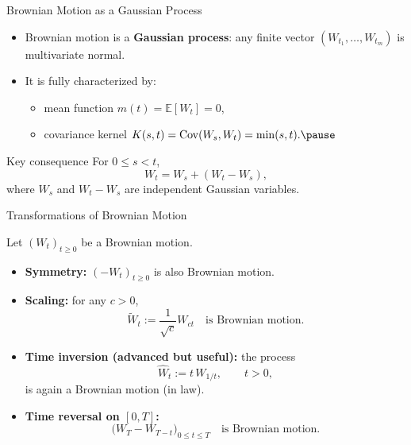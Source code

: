 \documentclass[10pt,aspectratio=169]{beamer}
\begin{document}
\begin{frame}{Brownian Motion as a Gaussian Process}

\begin{itemize}
  \item Brownian motion is a \textbf{Gaussian process}:\pause
  any finite vector \((W_{t_1},\dots,W_{t_m})\) is multivariate normal.\pause
  \item It is fully characterized by:\pause
  \begin{itemize}
    \item mean function \(m(t)=\mathbb{E}[W_t]=0\),\pause
    \item covariance kernel \(K(s,t)=\mathrm{Cov}(W_s,W_t)=\min(s,t).\pause\)
  \end{itemize}
\end{itemize}

\medskip
\begin{block}{Key consequence}
For \(0\le s<t\),
\[
W_t = W_s + (W_t-W_s),
\]
where \(W_s\) and \(W_t-W_s\) are independent Gaussian variables.
\end{block}

\end{frame}

\begin{frame}{Transformations of Brownian Motion}

Let \((W_t)_{t\ge0}\) be a Brownian motion.\pause

\begin{itemize}
  \item \textbf{Symmetry:}\pause\;
  \((-W_t)_{t\ge0}\) is also Brownian motion.\pause
  \item \textbf{Scaling:}\pause\;
  for any \(c>0\),
  \[
  \widetilde W_t := \frac{1}{\sqrt{c}}W_{ct}
  \quad \text{is Brownian motion.}
  \]
  \pause
  \item \textbf{Time inversion (advanced but useful):}\pause\;
  the process
  \[
  \widehat W_t := t\, W_{1/t}, \qquad t>0,
  \]
  is again a Brownian motion (in law).\pause
  \item \textbf{Time reversal on \([0,T]\):}\pause\;
  \[
  \big(W_T - W_{T-t}\big)_{0\le t\le T}
  \quad \text{is Brownian motion.}
  \]
\end{itemize}

\end{frame}
\end{document}
